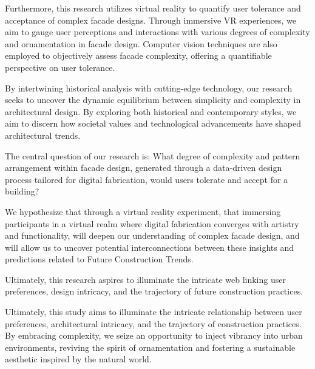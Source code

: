 Furthermore, this research utilizes virtual reality to quantify user tolerance and acceptance of complex facade designs.
Through immersive VR experiences, we aim to gauge user perceptions and interactions with various degrees of complexity and ornamentation in facade design.
Computer vision techniques are also employed to objectively assess facade complexity, offering a quantifiable perspective on user tolerance.

By intertwining historical analysis with cutting-edge technology, our research seeks to uncover the dynamic equilibrium between simplicity and complexity in architectural design.
By exploring both historical and contemporary styles, we aim to discern how societal values and technological advancements have shaped architectural trends.

The central question of our research is: What degree of complexity and pattern arrangement within facade design, generated through a data-driven design process tailored for digital fabrication, would users tolerate and accept for a building?

We hypothesize that through a virtual reality experiment, that immersing participants in a virtual realm where digital fabrication converges with artistry and functionality, will deepen our understanding of complex facade design, and will allow us to uncover potential interconnections between these insights and predictions related to Future Construction Trends.

Ultimately, this research aspires to illuminate the intricate web linking user preferences, design intricacy, and the trajectory of future construction practices.

Ultimately, this study aims to illuminate the intricate relationship between user preferences, architectural intricacy, and the trajectory of construction practices.
By embracing complexity, we seize an opportunity to inject vibrancy into urban environments, reviving the spirit of ornamentation and fostering a sustainable aesthetic inspired by the natural world.




